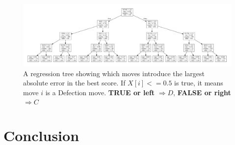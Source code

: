 \begin{figure}
    \includegraphics[width=1.0\textwidth, center]{./img/descriptive/reg_tree.pdf}
    \centering
    \caption{A regression tree showing which moves introduce the largest absolute error in the best score. If $X[i]<=0.5$ is true, it means move $i$ is a Defection move.
    \textbf{TRUE or left} $\Rightarrow D$, \textbf{FALSE or right} $\Rightarrow C$}
    \label{fig:reg_tree}
\end{figure}


\section{Conclusion}